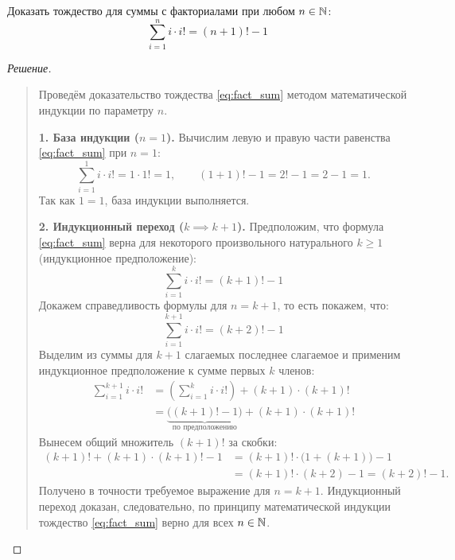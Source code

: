 \begin{problem}
    Доказать тождество для суммы с факториалами при любом $n \in \mathbb{N}$:
    \begin{equation} \label{eq:fact_sum}
        \sum_{i=1}^n i \cdot i! = (n + 1)! - 1 \tag{1}
    \end{equation}
\end{problem}

\begin{proof}[Решение]~\\
    \begin{quote}
        Проведём доказательство тождества \eqref{eq:fact_sum} методом 
        математической индукции по параметру $n$.

        \textbf{1. База индукции ($n = 1$).} Вычислим левую и правую части 
        равенства \eqref{eq:fact_sum} при $n = 1$:
        \[
            \sum_{i=1}^1 i \cdot i! = 1 \cdot 1! = 1, \qquad
            (1 + 1)! - 1 = 2! - 1 = 2 - 1 = 1.
        \]
        Так как $1 = 1$, база индукции выполняется.

        \textbf{2. Индукционный переход ($k \implies k + 1$).} 
        Предположим, что формула \eqref{eq:fact_sum} верна для некоторого 
        произвольного натурального $k \ge 1$ (индукционное предположение):
        \[
            \sum_{i=1}^k i \cdot i! = (k + 1)! - 1
        \]
        Докажем справедливость формулы для $n = k + 1$, то есть покажем, что:
        \[
            \sum_{i=1}^{k+1} i \cdot i! = (k + 2)! - 1
        \]
        Выделим из суммы для $k + 1$ слагаемых последнее слагаемое и 
        применим индукционное предположение к сумме первых $k$ членов:
        \begin{align*}
            \sum_{i=1}^{k+1} i \cdot i! &= 
            \left( \sum_{i=1}^k i \cdot i! \right) + (k + 1) \cdot (k + 1)! \\
            &= \underbrace{\bigl((k + 1)! - 1\bigr)}_{\text{по предположению}} 
            + (k + 1) \cdot (k + 1)!
        \end{align*}
        Вынесем общий множитель $(k + 1)!$ за скобки:
        \begin{align*}
            (k + 1)! + (k + 1) \cdot (k + 1)! - 1 &= 
            (k + 1)! \cdot \bigl(1 + (k + 1)\bigr) - 1 \\
            &= (k + 1)! \cdot (k + 2) - 1 = (k + 2)! - 1.
        \end{align*}
        Получено в точности требуемое выражение для $n = k + 1$. 
        Индукционный переход доказан, следовательно, по принципу 
        математической индукции тождество \eqref{eq:fact_sum} верно для 
        всех $n \in \mathbb{N}$.
    \end{quote}
\end{proof}

